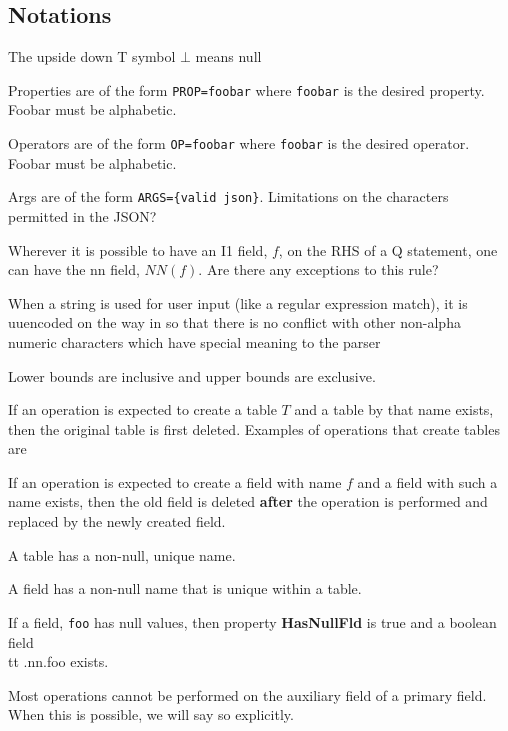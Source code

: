 \subsection{Notations}
\bi
\item The upside down T symbol \(\bot\) means null
\item Properties are of the form \verb+PROP=foobar+ where \verb+foobar+
is the desired property. Foobar must be alphabetic.
\item Operators are of the form \verb+OP=foobar+ where \verb+foobar+
is the desired operator. Foobar must be alphabetic.
\item Args are of the form \verb+ARGS={valid json}+. Limitations on the
characters permitted in the JSON? \TBC 
\item Wherever it is possible to have an I1 field, \(f\), on the RHS of a Q
statement, one can have the nn field, \(NN(f)\). Are there any
exceptions to this rule? \TBC
\item When a string is used for user input (like a regular expression
    match), it is uuencoded on the way in so that there is no conflict
with other non-alpha numeric characters which have special meaning to
the parser
\item Lower bounds are inclusive and upper bounds are exclusive.
\item If an operation is expected to create a table \(T\) and a table
by that name exists, then the original table is first deleted. Examples
of operations that create tables are \TBC
\item 
If an operation is expected to create a field with name \(f\) and a
field with such a name exists, then the old field is deleted {\bf after}
the operation is performed and replaced by the newly created field. 
\item A table has a non-null, unique name.
\item A field has a non-null name that is unique within a table.
\item If a field, {\tt foo} has null values, then property {\bf HasNullFld} is true and a boolean field {\\tt .nn.foo} exists.
\item Most operations cannot be performed on the auxiliary field of a primary
field. When this is possible, we will say so explicitly. 

\ei

